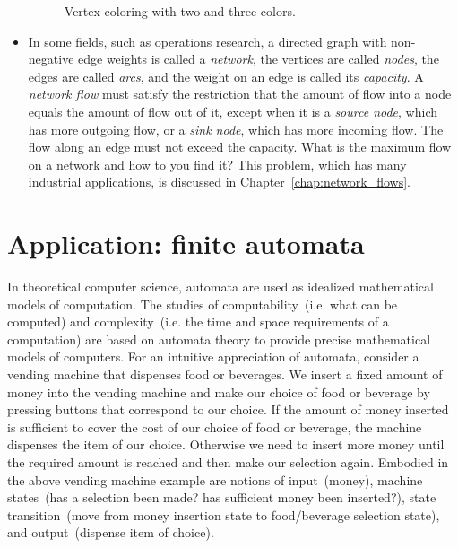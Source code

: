 \begin{itemize}
\begin{figure}[!htbp]
\centering
{}

\caption{Vertex coloring with two and three colors.}
\label{fig:introduction:vertex_coloring}
\end{figure}

\item In some fields, such as operations
  research, a directed graph with non-negative edge weights is called
  a \emph{network}, the vertices are called
  \emph{nodes}, the edges are called \emph{arcs}, and the weight on an
  edge is called its \emph{capacity}. A
  \emph{network flow} must satisfy the restriction
  that the amount of flow into a node equals the amount of flow out of
  it, except when it is a \emph{source node}, which has more outgoing
  flow, or a \emph{sink node}, which has more incoming flow. The flow
  along an edge must not exceed the capacity. What is the maximum flow
  on a network and how to you find it? This problem, which has many
  industrial applications, is discussed in
  Chapter~\ref{chap:network_flows}.
\end{itemize}



\section{Application: finite automata}

In theoretical computer science, automata are
used as idealized mathematical models of computation. The studies of
computability~(i.e. what can be computed) and complexity~(i.e. the
time and space requirements of a computation) are based on automata
theory to provide precise mathematical models of computers. For an
intuitive appreciation of automata, consider a
vending machine that dispenses food or
beverages. We insert a fixed amount of money into the vending machine
and make our choice of food or beverage by pressing buttons that
correspond to our choice. If the amount of money inserted is
sufficient to cover the cost of our choice of food or beverage, the
machine dispenses the item of our choice. Otherwise we need to insert
more money until the required amount is reached and then make our
selection again. Embodied in the above vending machine example are
notions of input~(money), machine states~(has a selection been made?
has sufficient money been inserted?), state transition~(move from
money insertion state to food/beverage selection state), and
output~(dispense item of choice).

